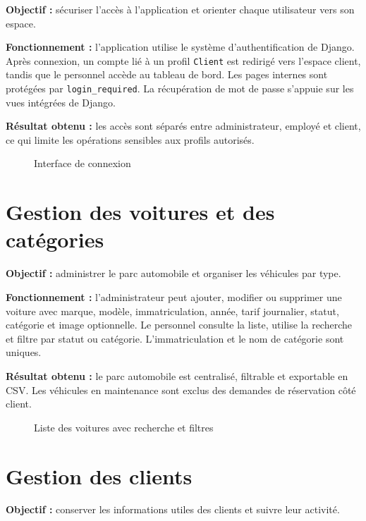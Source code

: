 \textbf{Objectif :} sécuriser l'accès à l'application et orienter chaque utilisateur vers son espace.

\textbf{Fonctionnement :} l'application utilise le système d'authentification de Django. Après connexion, un compte lié à un profil \texttt{Client} est redirigé vers l'espace client, tandis que le personnel accède au tableau de bord. Les pages internes sont protégées par \texttt{login\_required}. La récupération de mot de passe s'appuie sur les vues intégrées de Django.

\textbf{Résultat obtenu :} les accès sont séparés entre administrateur, employé et client, ce qui limite les opérations sensibles aux profils autorisés.

\begin{figure}[H]
\centering
{}
\caption{Interface de connexion}
\end{figure}

\section{Gestion des voitures et des catégories}

\textbf{Objectif :} administrer le parc automobile et organiser les véhicules par type.

\textbf{Fonctionnement :} l'administrateur peut ajouter, modifier ou supprimer une voiture avec marque, modèle, immatriculation, année, tarif journalier, statut, catégorie et image optionnelle. Le personnel consulte la liste, utilise la recherche et filtre par statut ou catégorie. L'immatriculation et le nom de catégorie sont uniques.

\textbf{Résultat obtenu :} le parc automobile est centralisé, filtrable et exportable en CSV. Les véhicules en maintenance sont exclus des demandes de réservation côté client.

\begin{figure}[H]
\centering
{}
\caption{Liste des voitures avec recherche et filtres}
\end{figure}

\section{Gestion des clients}

\textbf{Objectif :} conserver les informations utiles des clients et suivre leur activité.


